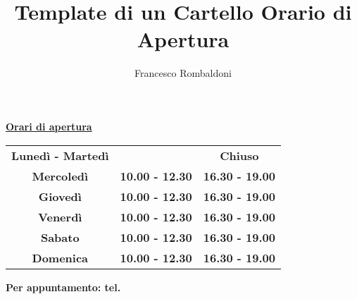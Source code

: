 \documentclass[hidelinks,12pt,a4paper]{article}
\newcommand{\entry}[3]{
	{\textbf{\huge{#1}}}&{\textbf{\huge{#2}}}&{\textbf{\huge{#3}}}\\
}
\newcommand{\hourSign}{
	\begin{center}
		\fboxrule=2pt
		\begin{adjustbox}{minipage=0.9\textwidth,precode=\dbox}
			\begin{roundCornerPage}[roundcorner=15pt]
				\begin{minipage}[t][0.7\textwidth][t]{\textwidth}
					\vspace*{5mm}
					\begin{center}
						{\fontsize{30pt}{36pt}\selectfont \textbf{\underline{Orari di apertura}}} 
						 
					\end{center}
					
						\vspace*{1.5cm}
						\begin{tabular*}{\linewidth}{ c c c }
							\entry{Lunedì - Martedì}{}{Chiuso}
							\entry{Mercoledì}{10.00 - 12.30}{16.30 - 19.00}
							\entry{Giovedì}{10.00 - 12.30}{16.30 - 19.00}
							\entry{Venerdì}{10.00 - 12.30}{16.30 - 19.00}
							\entry{Sabato}{10.00 - 12.30}{16.30 - 19.00}
							\entry{Domenica}{10.00 - 12.30}{16.30 - 19.00}
						\end{tabular*}
				\vspace*{2cm}
				\begin{center}
					{\Large
						\textbf{Per appuntamento: tel. } 
					}
				\end{center}
				
				\end{minipage}
			\end{roundCornerPage}
		\end{adjustbox}
	\end{center}
}
\begin{document}
	\pagestyle{empty}
	
	\title{\textbf{Template di un Cartello Orario di Apertura}}
	\author{Francesco Rombaldoni}
	\date{}
	
	\maketitle
	\newpage
	
	\hourSign
	
	\newpage
	\vspace*{\fill}
	\begin{center}
		\begin{minipage}{0.8\linewidth}
			\doclicenseThis
		\end{minipage}
	\end{center}
	
\end{document}
